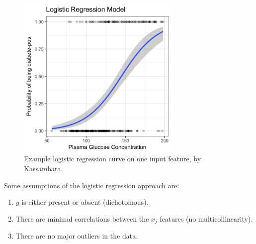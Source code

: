 \begin{figure}
\centering
\includegraphics[width=0.7\textwidth]{figures/regression/logistic-regression-probabilities-curve.png}
\caption{
Example logistic regression curve on one input feature, by \href{http://www.sthda.com/english/articles/36-classification-methods-essentials/151-logistic-regression-essentials-in-r/}{Kassambara}.
}
\label{fig:logistic_regression_ex}
\end{figure}

Some assumptions of the logistic regression approach are:
\begin{enumerate}[noitemsep]
  \item $y$ is either present or absent (dichotomous).
  \item There are minimal correlations between the $x_{j}$ features (no multicollinearity).
  \item There are no major outliers in the data.
\end{enumerate}

